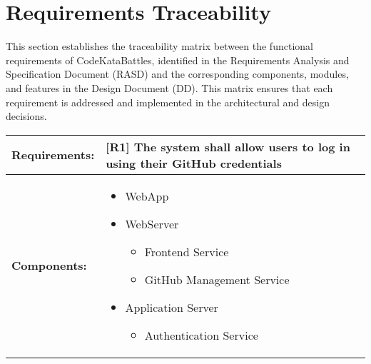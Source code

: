\section{Requirements Traceability}
This section establishes the traceability matrix between the  functional requirements of CodeKataBattles, identified in the Requirements Analysis and Specification Document (RASD) and the corresponding components, modules, and features in the Design Document (DD). This matrix ensures that each requirement is addressed and implemented in the architectural and design decisions.



\begin{table}[!ht]
    \centering
    {\renewcommand{\arraystretch}{2} %
    \setlength{\tabcolsep}{0.5em} %
    \begin{tabular}{|l|l|}
    \hline
       \textbf{Requirements:} & [R1] The system shall allow users to log in using their GitHub credentials \\ \hline
        \textbf{Components:} & 
        \begin{minipage} [t] {0.4\textwidth} 
      \begin{itemize}
      \item WebApp
      \item WebServer
        \begin{itemize}
            \item Frontend Service
            \item GitHub Management Service
        \end{itemize}
      \item Application Server
        \begin{itemize}
            \item Authentication Service
        \end{itemize}
     \end{itemize} 
    \end{minipage} \\ [2pt]  \hline
    \end{tabular}} \quad
\end{table}

